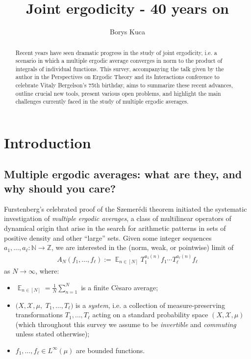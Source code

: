 \documentclass[11pt]{amsart}
\title[]{Joint ergodicity - 40 years on}
\author{Borys Kuca}
\date{}
\theoremstyle{definition}
\DeclareMathOperator*{\E}{\mathbb{E}}
\newcommand{\N}{{\mathbb N}}
\newcommand{\Z}{{\mathbb Z}}
\newcommand{\CX}{{\mathcal X}}
\newcommand{\1}{{\mathbf{1}}}
\begin{document}
\begin{abstract}
Recent years have seen dramatic progress in the study of joint ergodicity, i.e. a scenario in which a multiple ergodic average converges in norm to the product of integrals of individual functions. This survey, accompanying the talk given by the author in the Perspectives on Ergodic Theory and its Interactions conference to celebrate Vitaly Bergelson's 75th birthday, aims to summarize these recent advances, outline crucial new tools, present various open problems, and highlight the main challenges currently faced in the study of multiple ergodic averages.
\end{abstract}

\maketitle


\tableofcontents

\section{Introduction}\label{S: introduction}
\subsection{Multiple ergodic averages: what are they, and why should you care?}

Furstenberg's celebrated proof of the Szemer\'edi theorem \cite{Fu77} initiated the systematic investigation of \emph{multiple ergodic averages}, a class of multilinear operators of dynamical origin that arise in the search for arithmetic patterns in sets of positive density and other ``large'' sets. Given some integer sequences $a_1, \ldots, a_\ell:\N\to\Z$, %
we are interested in the (norm, weak, or pointwise) limit of
\begin{align*}
A_N(f_1, \ldots, f_\ell):=\E_{n\in[N]} T_1^{a_1(n)}f_1\cdots T_\ell^{a_\ell(n)}f_\ell
\end{align*}
as $N\to\infty$, where:
\begin{itemize}
\item $\E_{n\in[N]} = \frac{1}{N}\sum_{n=1}^N$ is a finite C\`esaro average;
\item $(X, \CX, \mu,$\! $T_1, \ldots, T_\ell)$ is a \emph{system}, i.e. a collection of measure-preserving transformations  $T_1, \ldots, T_\ell$ acting on a standard probability space $(X, \CX, \mu)$ (which throughout this survey we assume to be \emph{invertible} and \emph{commuting} unless stated otherwise);
\item $f_1, \ldots, f_\ell\in L^\infty(\mu)$ are bounded functions.
\end{itemize}
\end{document}

